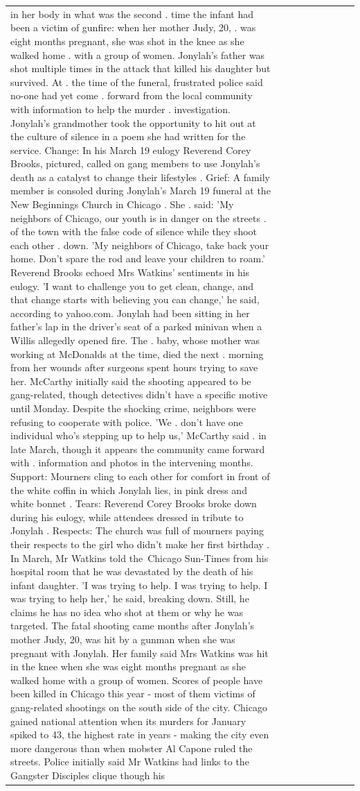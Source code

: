 \begin{table}[H]
\begin{tabular}{lllrlllll}
in her body in what was the second . time the infant had been a victim of gunfire: when her mother Judy, 20, . was eight months pregnant, she was shot in the knee as she walked home . with a group of women. Jonylah's father was shot multiple times in the attack that killed his daughter but survived. At . the time of the funeral, frustrated police said no-one had yet come . forward from the local community with information to help the murder . investigation. Jonylah's grandmother took the opportunity to hit out at the culture of silence in a poem she had written for the service. Change: In his March 19 eulogy Reverend Corey Brooks, pictured, called on gang members to use Jonylah's death as a catalyst to change their lifestyles . Grief: A family member is consoled during Jonylah's March 19 funeral at the New Beginnings Church in Chicago . She . said: 'My neighbors of Chicago, our youth is in danger on the streets . of the town with the false code of silence while they shoot each other . down. 'My neighbors of Chicago, take back your home. Don't spare the rod and leave your children to roam.' Reverend Brooks echoed Mrs Watkins' sentiments in his eulogy. 'I want to challenge you to get clean, change, and that change starts with believing you can change,' he said, according to yahoo.com. Jonylah had been sitting in her father's lap in the driver's seat of a parked minivan when a Willis allegedly opened fire. The . baby, whose mother was working at McDonalds at the time, died the next . morning from her wounds after surgeons spent hours trying to save her. McCarthy initially said the shooting appeared to be gang-related, though detectives didn't have a specific motive until Monday. Despite the shocking crime, neighbors were refusing to cooperate with police. 'We . don't have one individual who's stepping up to help us,' McCarthy said . in late March, though it appears the community came forward with . information and photos in the intervening months. Support: Mourners cling to each other for comfort in front of the white coffin in which Jonylah lies, in pink dress and white bonnet . Tears: Reverend Corey Brooks broke down during his eulogy, while attendees dressed in tribute to Jonylah . Respects: The church was full of mourners paying their respects to the girl who didn't make her first birthday . In March, Mr Watkins told the Chicago Sun-Times from his hospital room that he was devastated by the death of his infant daughter. 'I was trying to help. I was trying to help. I was trying to help her,' he said, breaking down. Still, he claims he has no idea who shot at them or why he was targeted. The fatal shooting came months after Jonylah's mother Judy, 20, was hit by a gunman when she was pregnant with Jonylah. Her family said Mrs Watkins was hit in the knee when she was eight months pregnant as she walked home with a group of women. Scores of people have been killed in Chicago this year - most of them victims of gang-related shootings on the south side of the city. Chicago gained national attention when its murders for January spiked to 43, the highest rate in years - making the city even more dangerous than when mobster Al Capone ruled the streets. Police initially said Mr Watkins had links to the Gangster Disciples clique though his 
\end{tabular}
\end{table}
